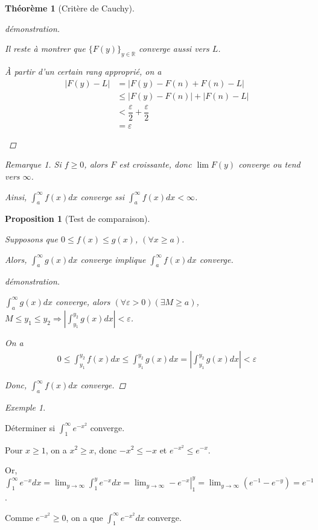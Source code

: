 \documentclass{report}
\newcommand*{\abs}[1]{\left| #1 \right|}
\newcommand*{\eps}{\varepsilon}
\newcommand*{\reels}{\mathbb{R}}
\newtheorem*{thm}{Th\'eor\`eme}
\newtheorem*{prop}{Proposition}
\theoremstyle{definition}
\theoremstyle{remark}
\newtheorem*{exem}{Exemple}
\newtheorem*{rema}{Remarque}
\begin{document}
\begin{thm}[Crit\`ere de Cauchy]
\begin{proof}[d\'emonstration]
\begin{itemize}
				Il reste \`a montrer que $\{F(y)\}_{y \in \reels}$ converge aussi vers $L$.

				\`A partir d'un certain rang appropri\'e, on a
				\begin{align*}
					\abs{F(y)-L}&= \abs{F(y) - F(n) + F(n) - L}\\
					&\leq \abs{F(y)-F(n)} + \abs{F(n)-L}\\
					&< \dfrac{\eps}{2} + \dfrac{\eps}{2}\\
					&= \eps
				\end{align*}
			\end{itemize}
		\end{proof}
		\begin{rema}
		Si $f \geq 0$, alors $F$ est croissante, donc $\lim F(y)$ converge ou tend vers $\infty$.

		Ainsi, $\displaystyle\int_{a}^{\infty}f(x)dx$ converge ssi $\displaystyle\int_{a}^{\infty}f(x)dx < \infty$.
		\end{rema}
	\end{thm}
	\begin{prop}[Test de comparaison]~

		Supposons que $0 \leq f(x) \leq g(x)$, $(\forall x \geq a)$.

		Alors, $\displaystyle\int_{a}^{\infty}g(x)dx$ converge implique $\displaystyle\int_{a}^{\infty}f(x)dx$ converge.
		\begin{proof}[d\'emonstration]~

			$\displaystyle\int_{a}^{\infty}g(x)dx$ converge, alors $(\forall\eps>0) (\exists M \geq a)$, $M \leq y_1 \leq y_2 \Rightarrow \abs{\displaystyle\int_{y_1}^{y_2}g(x)dx}<\eps$.

			On a
			\begin{align*}
				0 \leq \int_{y_1}^{y_2}f(x)dx \leq \int_{y_1}^{y_2}g(x)dx = \abs{\int_{y_1}^{y_2}g(x)dx} < \eps
			\end{align*}

			Donc, $\displaystyle\int_{a}^{\infty}f(x)dx$ converge.
		\end{proof}
	\end{prop}
	\begin{exem}
		~

		D\'eterminer si $\displaystyle\int_{1}^{\infty}e^{-x^2}$ converge.

		Pour $x \geq 1$, on a $x^2 \geq x$, donc $-x^2 \leq -x$ et $e^{-x^2} \leq e^{-x}$.

		Or, $\displaystyle\int_{1}^{\infty}e^{-x}dx = \lim_{y \to \infty}\displaystyle\int_{1}^{y}e^{-x}dx = \left. \lim_{y \to \infty}-e^{-x}\right|^y_1 = \lim_{y \to \infty}(e^{-1} - e^{-y}) = e^{-1}$.

		Comme $e^{-x^2} \geq 0$, on a que $\displaystyle\int_{1}^{\infty}e^{-x^2}dx$ converge.
	\end{exem}
\end{document}

